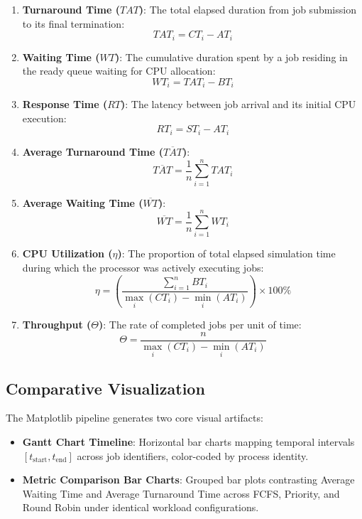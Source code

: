 \documentclass[12pt,a4paper]{article}
\begin{document}
\begin{enumerate}
    \item \textbf{Turnaround Time ($TAT$)}: The total elapsed duration from job submission to its final termination:
    \begin{equation}
    TAT_i = CT_i - AT_i
    \end{equation}
    \item \textbf{Waiting Time ($WT$)}: The cumulative duration spent by a job residing in the ready queue waiting for CPU allocation:
    \begin{equation}
    WT_i = TAT_i - BT_i
    \end{equation}
    \item \textbf{Response Time ($RT$)}: The latency between job arrival and its initial CPU execution:
    \begin{equation}
    RT_i = ST_i - AT_i
    \end{equation}
    \item \textbf{Average Turnaround Time ($\overline{TAT}$)}:
    \begin{equation}
    \overline{TAT} = \frac{1}{n} \sum_{i=1}^n TAT_i
    \end{equation}
    \item \textbf{Average Waiting Time ($\overline{WT}$)}:
    \begin{equation}
    \overline{WT} = \frac{1}{n} \sum_{i=1}^n WT_i
    \end{equation}
    \item \textbf{CPU Utilization ($\eta$)}: The proportion of total elapsed simulation time during which the processor was actively executing jobs:
    \begin{equation}
    \eta = \left( \frac{\sum_{i=1}^n BT_i}{\max_{i}(CT_i) - \min_{i}(AT_i)} \right) \times 100\%
    \end{equation}
    \item \textbf{Throughput ($\Theta$)}: The rate of completed jobs per unit of time:
    \begin{equation}
    \Theta = \frac{n}{\max_{i}(CT_i) - \min_{i}(AT_i)}
    \end{equation}
\end{enumerate}

\subsection{Comparative Visualization}
The Matplotlib pipeline generates two core visual artifacts:
\begin{itemize}
    \item \textbf{Gantt Chart Timeline}: Horizontal bar charts mapping temporal intervals $[t_{\text{start}}, t_{\text{end}}]$ across job identifiers, color-coded by process identity.
    \item \textbf{Metric Comparison Bar Charts}: Grouped bar plots contrasting Average Waiting Time and Average Turnaround Time across FCFS, Priority, and Round Robin under identical workload configurations.
\end{itemize}
\end{document}
